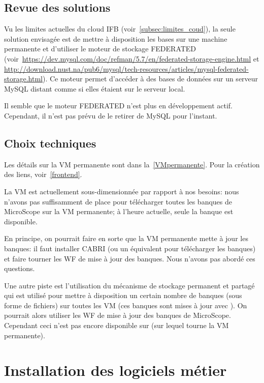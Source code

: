 \subsection{Revue des solutions}

Vu les limites actuelles du cloud IFB (voir~\autoref{subsec:limites_coud}),
la seule solution envisagée est de mettre à disposition les bases sur une machine permanente et
d'utiliser le moteur de stockage FEDERATED (voir~\url{https://dev.mysql.com/doc/refman/5.7/en/federated-storage-engine.html} et \url{http://download.nust.na/pub6/mysql/tech-resources/articles/mysql-federated-storage.html}).
Ce moteur permet d'accéder à des bases de données sur un serveur MySQL distant comme si elles étaient sur le serveur local.

\begin{warningbox}
    Il semble que le moteur FEDERATED n'est plus en développement actif.
    Cependant, il n'est pas prévu de le retirer de MySQL pour l'instant.
\end{warningbox}

\subsection{Choix techniques}

Les détails sur la VM permanente sont dans la~\autoref{VMpermanente}.
Pour la création des liens, voir~\autoref{frontend}.

La VM est actuellement sous-dimensionnée par rapport à nos besoins:
nous n'avons pas suffisamment de place pour télécharger toutes les banques de MicroScope sur la VM permanente;
à l'heure actuelle, seule la banque  est disponible.

En principe, on pourrait faire en sorte que la VM permanente mette à jour les banques:
il faut installer CABRI (ou un équivalent pour télécharger les banques) et faire tourner les WF de mise à jour des banques.
Nous n'avons pas abordé ces questions.

Une autre piste est l'utilisation du mécanisme de stockage permanent et partagé
qui est utilisé pour mettre à disposition un certain nombre de banques (sous forme de fichiers)
sur toutes les VM (ces banques sont mises à jour avec ).
On pourrait alors utiliser les WF de mise à jour des banques de MicroScope.
Cependant ceci n'est pas encore disponible sur  (sur lequel tourne la VM permanente).

\section{Installation des logiciels métier} \label{sec:installation_logiciels_metier}

